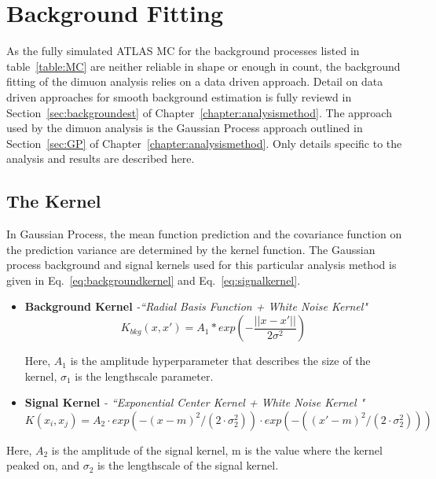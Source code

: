 \section{Background Fitting}
As the fully simulated ATLAS MC for the background processes listed in table~\ref{table:MC} are neither reliable in shape or enough in count, the background fitting of the dimuon analysis relies on a data driven approach. Detail on data driven approaches for smooth background estimation is fully reviewd in Section~\ref{sec:backgroundest} of Chapter~\ref{chapter:analysismethod}. The approach used by the dimuon analysis is the Gaussian Process approach outlined in
Section~\ref{sec:GP} of Chapter~\ref{chapter:analysismethod}. Only details specific to the analysis and results are described here.

\subsection{The Kernel}
In Gaussian Process, the mean function prediction and the covariance function on the prediction variance are determined by the kernel function.
The Gaussian process background and signal kernels used for this particular analysis method is given in Eq.~\ref{eq:backgroundkernel} and Eq.~\ref{eq:signalkernel}. 

\begin{itemize}
    \item \textbf{Background Kernel} \textit{-``Radial Basis Function + White Noise Kernel"}
        \begin{equation}
                K_{bkg}(x, x') = A_{1} * exp(-\frac{||x-x'||}{2\sigma^{2}}) 
        \label{eq:backgroundkernel}
        \end{equation}

    Here, $A_{1}$ is the amplitude hyperparameter that describes the size of the kernel, $\sigma_{1}$ is the lengthscale parameter.
\item \textbf{Signal Kernel} \textit{- ``Exponential Center Kernel + White Noise Kernel "}
            \begin{equation}
            K(x_{i}, x_{j})=A_{2}\cdot exp(-(x-m)^{2}/(2\cdot\sigma_{2}^{2}))\cdot exp(-((x'-m)^{2}/(2\cdot\sigma_{2}^{2})))
            \label{eq:signalkernel}
            \end{equation}
\end{itemize}

    Here, $A_{2}$ is the amplitude of the signal kernel, m is the value where the kernel peaked on, and $\sigma_{2}$ is the lengthscale of the signal kernel. 

